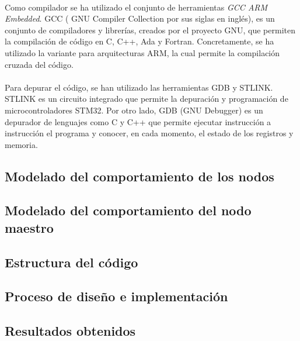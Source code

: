 	\paragraph{}
	Como compilador se ha utilizado el conjunto de herramientas \textit{GCC ARM Embedded}. GCC ( GNU Compiler Collection por sus siglas en inglés), es un conjunto de compiladores y librerías, creados por el proyecto GNU, que permiten la compilación de código en C, C++, Ada y Fortran. Concretamente, se ha utilizado la variante para arquitecturas ARM, la cual permite la compilación cruzada del código.
	\paragraph{}
	Para depurar el código, se han utilizado las herramientas GDB y STLINK. STLINK es un circuito integrado que permite la depuración y programación de microcontroladores STM32. Por otro lado, GDB (GNU Debugger) es un depurador de lenguajes como C y C++ que permite ejecutar instrucción a instrucción el programa y conocer, en cada momento, el estado de los registros y memoria. 
	
				
	\subsection{Modelado del comportamiento de los nodos}
	
	\subsection{Modelado del comportamiento del nodo maestro}
	
	\subsection{Estructura del código}
	\subsection{Proceso de diseño e implementación}
	\subsection{Resultados obtenidos}
	
	
	